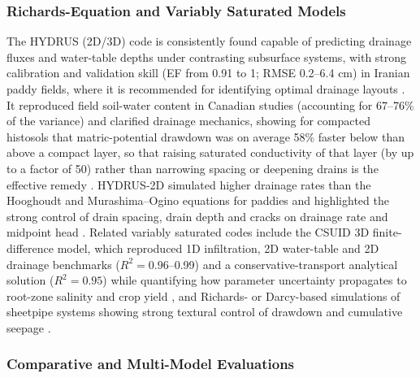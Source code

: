 \documentclass[11pt]{article}
\begin{document}
\subsubsection{Richards-Equation and Variably Saturated Models}

The HYDRUS (2D/3D) code is consistently found capable of predicting drainage fluxes and water-table depths under contrasting subsurface systems, with strong calibration and validation skill (EF from 0.91 to 1; RMSE 0.2--6.4 cm) in Iranian paddy fields, where it is recommended for identifying optimal drainage layouts \parencite{Karandish2018,DarziNaftchali2018}. It reproduced field soil-water content in Canadian studies (accounting for 67--76\% of the variance) and clarified drainage mechanics, showing for compacted histosols that matric-potential drawdown was on average 58\% faster below than above a compact layer, so that raising saturated conductivity of that layer (by up to a factor of 50) rather than narrowing spacing or deepening drains is the effective remedy \parencite{Mante2018,Guedessou2021}. HYDRUS-2D simulated higher drainage rates than the Hooghoudt and Murashima--Ogino equations for paddies and highlighted the strong control of drain spacing, drain depth and cracks on drainage rate and midpoint head \parencite{Ebrahimian2015}. Related variably saturated codes include the CSUID 3D finite-difference model, which reproduced 1D infiltration, 2D water-table and 2D drainage benchmarks ($R^2=0.96$--0.99) and a conservative-transport analytical solution ($R^2=0.95$) while quantifying how parameter uncertainty propagates to root-zone salinity and crop yield \parencite{Alzraiee2013b,Alzraiee2013}, and Richards- or Darcy-based simulations of sheetpipe systems showing strong textural control of drawdown and cumulative seepage \parencite{Saptomo2021,Li2021}.

\subsubsection{Comparative and Multi-Model Evaluations}
\end{document}
